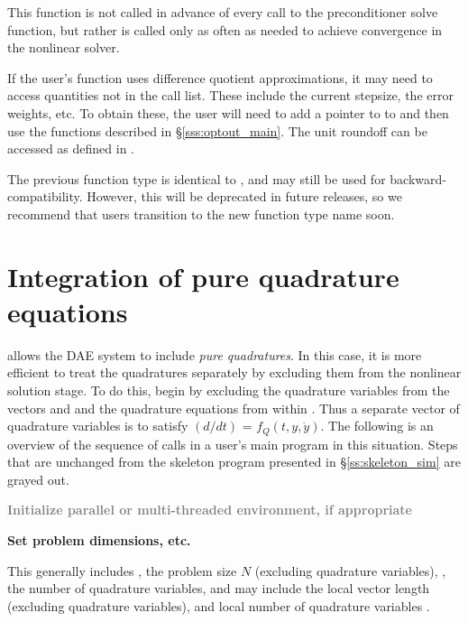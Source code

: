 {{  This function is not called in advance of every call to the preconditioner solve
  function, but rather is called only as often as needed to achieve convergence in
  the nonlinear solver.

  If the user's  function uses difference quotient
  approximations, it may need to access quantities not in the call
  list. These include the current stepsize, the error weights, etc.
  To obtain these, the user will need to add a pointer to 
  to  and then use the  functions described in
  \S\ref{sss:optout_main}. The unit roundoff can be accessed as
   defined in .

  The previous function type  is identical to
  , and may still be used for backward-compatibility.
  However, this will be deprecated in future releases, so we recommend
  that users transition to the new function type name soon.
}

\section{Integration of pure quadrature equations}\label{ss:purequads}
{\idas} allows the DAE system to include {\em pure quadratures}.  In
this case, it is more efficient to treat the quadratures separately by
excluding them from the nonlinear solution stage.  To do this, begin
by excluding the quadrature variables from the vectors  and
 and the quadrature equations from within .  Thus a
separate vector  of quadrature variables is to satisfy
$(d/dt)$ = $f_Q(t,y,\dot{y})$.  The following is an overview of the
sequence of calls in a user's main program in this situation. Steps
that are unchanged from the skeleton program presented in
\S\ref{ss:skeleton_sim} are grayed out.

\begin{Steps}

\item
  \textcolor{gray}{\bf Initialize parallel or multi-threaded environment,
   if appropriate}

\item
  {\bf Set problem dimensions, etc.}

  This generally includes , the problem size $N$ (excluding quadrature
  variables), , the number of quadrature variables, and may include
  the local vector length  (excluding quadrature variables), and
  local number of quadrature variables .


\end{Steps}}
